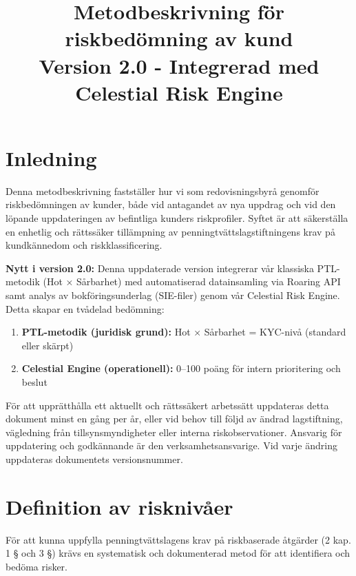 \documentclass{article}
\title{Metodbeskrivning för riskbedömning av kund\\\large Version 2.0 - Integrerad med Celestial Risk Engine}
\begin{document}
\vspace{1em}

\maketitle
\tableofcontents
\newpage

\section*{Inledning}

Denna metodbeskrivning fastställer hur vi som redovisningsbyrå genomför riskbedömningen av kunder, både vid antagandet av nya uppdrag och vid den löpande uppdateringen av befintliga kunders riskprofiler. Syftet är att säkerställa en enhetlig och rättssäker tillämpning av penningtvättslagstiftningens krav på kundkännedom och riskklassificering.

\textbf{Nytt i version 2.0:} Denna uppdaterade version integrerar vår klassiska PTL-metodik (Hot × Sårbarhet) med automatiserad datainsamling via Roaring API samt analys av bokföringsunderlag (SIE-filer) genom vår Celestial Risk Engine. Detta skapar en tvådelad bedömning:

\begin{enumerate}
\item \textbf{PTL-metodik (juridisk grund):} Hot × Sårbarhet = KYC-nivå (standard eller skärpt)
\item \textbf{Celestial Engine (operationell):} 0--100 poäng för intern prioritering och beslut
\end{enumerate}

För att upprätthålla ett aktuellt och rättssäkert arbetssätt uppdateras detta dokument minst en gång per år, eller vid behov till följd av ändrad lagstiftning, vägledning från tillsynsmyndigheter eller interna riskobservationer. Ansvarig för uppdatering och godkännande är den verksamhetsansvarige. Vid varje ändring uppdateras dokumentets versionsnummer.

\section*{Definition av risknivåer}

För att kunna uppfylla penningtvättslagens krav på riskbaserade åtgärder (2 kap. 1 § och 3 §) krävs en systematisk och dokumenterad metod för att identifiera och bedöma risker. 
\end{document}
